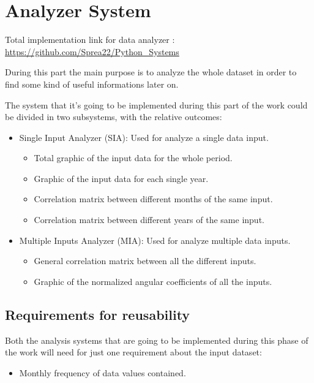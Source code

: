 
\chapter{Analyzer System}

Total implementation link for data analyzer : \\
\url{https://github.com/Sprea22/Python_Systems}

During this part the main purpose is to analyze the whole dataset in order to find some kind of useful informations later on. 

The system that it's going to be implemented during this part of the work could be divided in two subsystems, with the relative outcomes:
\begin{itemize}
\item Single Input Analyzer (SIA): Used for analyze a single data input.
\begin{itemize}
\item Total graphic of the input data for the whole period.
\item Graphic of the input data for each single year.
\item Correlation matrix between different months of the same input.
\item Correlation matrix between different years of the same input.
\end{itemize}
\item Multiple Inputs Analyzer (MIA): Used for analyze multiple data inputs.
\begin{itemize}
\item General correlation matrix between all the different inputs.

\item Graphic of the normalized angular coefficients of all the inputs.
\end{itemize}
\end{itemize}

\newpage

\section{Requirements for reusability}
Both the analysis systems that are going to be implemented during this phase of the work will need for just one requirement about the input dataset:
\begin{itemize}
\item Monthly frequency of data values contained.
\end{itemize}

